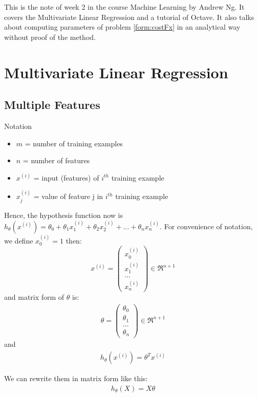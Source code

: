 This is the note of week 2 in the course Machine Learning by Andrew Ng. It covers the Multivariate Linear Regression and a tutorial of Octave. It also talks about computing parameters of problem \eqref{form:costFx} in an analytical way without proof of the method. 

\section{Multivariate Linear Regression}
\subsection{Multiple Features}
Notation
\begin{itemize}
 	\item $m$ = number of training examples
 	\item $n$ = number of features
 	\item $x^{(i)}$ = input (features) of $i^{th}$ training example
 	\item $x_{j}^{(i)}$ = value of feature j in $i^{th}$ training example
 \end{itemize} 

Hence, the hypothesis function now is $h_{\theta}(x^{(i)}) = \theta_0 + \theta_1 x_1^{(i)} + \theta_2 x_2^{(i)} + ... + \theta_n x_n^{(i)}$. For convenience of notation, we define $x_0^{(i)} = 1$ then:
\[
x^{(i)} = \begin{pmatrix}
x_0^{(i)} \\
x_1^{(i)} \\
... \\
x_n^{(i)}
\end{pmatrix} \in \Re^{n+1}  
\]
and matrix form of $\theta$ is:
\begin{align} \label{form:MatTheta}
\theta = \begin{pmatrix}
\theta_0 \\
\theta_1 \\
... \\
\theta_n
\end{pmatrix} \in \Re^{n+1}
\end{align}
and
\begin{align}
\label{form:w2mulVarH}
h_\theta(x^{(i)}) = \theta^{T}x^{(i)}
\end{align}

We can rewrite them in matrix form like this:
\begin{align} \label{eq:hypo}
  h_\theta(X) = X\theta 
\end{align}

